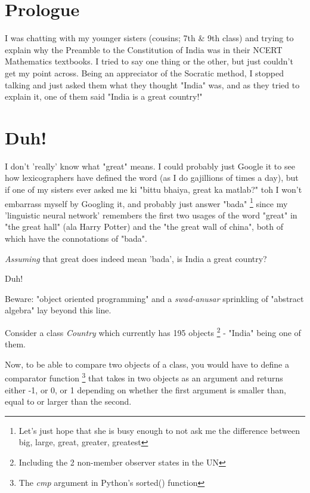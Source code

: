 \documentclass[]{report}
\begin{document}
\chapter{Prologue}

I was chatting with my younger sisters (cousins; 7th \& 9th class) and trying to explain why the Preamble to the Constitution of India was in their NCERT Mathematics textbooks.
I tried to say one thing or the other, but just couldn't get my point across.
Being an appreciator of the Socratic method, I stopped talking and just asked them what they thought "India" was, and as they tried to explain it, one of them said "India is a great country!"

\newpage

\chapter{Duh!}

I don't 'really' know what "great" means. I could probably just Google it to see how lexicographers have defined the word (as I do gajillions of times a day), but if one of my sisters ever asked me ki "bittu bhaiya, great ka matlab?" toh I won't embarrass myself by Googling it, and probably just answer "bada" 
\footnote{Let's just hope that she is busy enough to not ask me the difference between big, large, great, greater, greatest}
since my 'linguistic neural network' remembers the first two usages of the word "great" in "the great hall" (ala Harry Potter) and the "the great wall of china", both of which have the connotations of "bada".

\textit{Assuming} that great does indeed mean 'bada', is India a great country?

Duh!

Beware: "object oriented programming" and a \textit{swad-anusar} sprinkling of "abstract algebra" lay beyond this line.

\newpage

Consider a class \textit{Country} which currently has 195 objects \footnote{Including the 2 non-member observer states in the UN} - "India" being one of them.

Now, to be able to compare two objects of a class, you would have to define a comparator function
\footnote{The \textit{cmp} argument in Python's sorted() function} 
that takes in two objects as an argument and returns either -1, or 0, or 1 depending on whether the first argument is smaller than, equal to or larger than the second.
\end{document}

